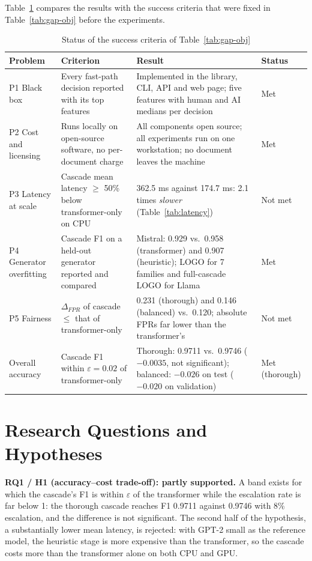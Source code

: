 Table~\ref{tab:criteria-status} compares the results with the success criteria
that were fixed in Table~\ref{tab:gap-obj} before the experiments.

\begin{table}[H]
\caption{Status of the success criteria of Table~\ref{tab:gap-obj}}
\label{tab:criteria-status}
\centering
\small
\begin{tabularx}{\textwidth}{|p{2.5cm}|p{4.0cm}|L|p{1.5cm}|}
\hline
\textbf{Problem} & \textbf{Criterion} & \textbf{Result} & \textbf{Status} \\ \hline
P1 Black box & Every fast-path decision reported with its top features & Implemented in the library, CLI, API and web page; five features with human and AI medians per decision & Met \\ \hline
P2 Cost and licensing & Runs locally on open-source software, no per-document charge & All components open source; all experiments run on one workstation; no document leaves the machine & Met \\ \hline
P3 Latency at scale & Cascade mean latency $\ge$ 50\% below transformer-only on CPU & 362.5 ms against 174.7 ms: 2.1 times \emph{slower} (Table~\ref{tab:latency}) & Not met \\ \hline
P4 Generator overfitting & Cascade F1 on a held-out generator reported and compared & Mistral: 0.929 vs.\ 0.958 (transformer) and 0.907 (heuristic); LOGO for 7 families and full-cascade LOGO for Llama & Met \\ \hline
P5 Fairness & $\Delta_{FPR}$ of cascade $\le$ that of transformer-only & 0.231 (thorough) and 0.146 (balanced) vs.\ 0.120; absolute FPRs far lower than the transformer's & Not met \\ \hline
Overall accuracy & Cascade F1 within $\varepsilon = 0.02$ of transformer-only & Thorough: 0.9711 vs.\ 0.9746 ($-0.0035$, not significant); balanced: $-0.026$ on test ($-0.020$ on validation) & Met (thorough) \\ \hline
\end{tabularx}
\end{table}

\section{Research Questions and Hypotheses}
\label{sec:hypotheses}

\textbf{RQ1 / H1 (accuracy--cost trade-off): partly supported.} A band exists
for which the cascade's F1 is within $\varepsilon$ of the transformer while the
escalation rate is far below 1: the thorough cascade reaches F1 0.9711 against
0.9746 with 8\% escalation, and the difference is not significant. The second
half of the hypothesis, a substantially lower mean latency, is rejected: with
GPT-2 small as the reference model, the heuristic stage is more expensive than
the transformer, so the cascade costs more than the transformer alone on both
CPU and GPU.

